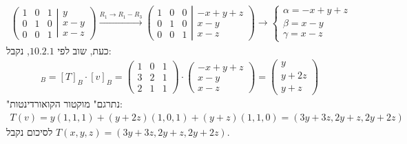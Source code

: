 \documentclass{article}
\begin{document}
\begin{align*}
    \left(
    \begin{matrix}
            1 & 0 & 1 \\
            0 & 1 & 0 \\
            0 & 0 & 1
        \end{matrix}
    \left|
    \begin{matrix}
            y   \\
            x-y \\
            x-z
        \end{matrix}
    \right.
    \right)
    \xrightarrow[]{R_1\rightarrow R_1-R_3}
    \left(
    \begin{matrix}
            1 & 0 & 0 \\
            0 & 1 & 0 \\
            0 & 0 & 1
        \end{matrix}
    \left|
    \begin{matrix}
            -x+y+z \\
            x-y    \\
            x-z
        \end{matrix}
    \right.
    \right)
    \rightarrow
    \begin{cases}
        \alpha=-x+y+z \\
        \beta = x-y   \\
        \gamma= x-z
    \end{cases}
\end{align*}
כעת, שוב לפי $10.2.1$, נקבל:
\begin{align*}
    [T(v)]_B=[T]_B\cdot [v]_B=
    \begin{pmatrix}
        1 & 0 & 1 \\
        3 & 2 & 1 \\
        2 & 1 & 1
    \end{pmatrix} \cdot
    \begin{pmatrix}
        -x+y+z \\
        x-y    \\
        x-z
    \end{pmatrix}
    = \begin{pmatrix}
        y    \\
        y+2z \\
        y+z
    \end{pmatrix}
\end{align*}
"נתרגם" מוקטור הקואורדינטות:
\begin{align*}
    T(v)=y(1,1,1)+(y+2z)(1,0,1) + (y+z)(1,1,0)=(3y+3z, 2y+z, 2y+2z)
\end{align*}
לסיכום נקבל $T(x,y,z)=(3y+3z, 2y+z, 2y+2z)$.
\end{document}
